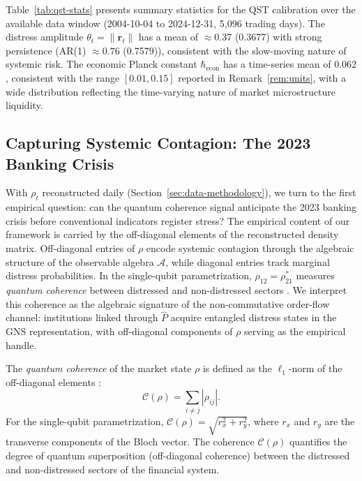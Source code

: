 

Table~\ref{tab:qst-stats} presents summary statistics for the QST calibration over
the available data window (2004-10-04 to 2024-12-31, 5{,}096 trading days). The
distress amplitude $\theta_t = \|\mathbf{r}_t\|$ has a mean of $\approx 0.37$ (0.3677) with strong
persistence (AR(1) $\approx 0.76$ (0.7579)), consistent with the slow-moving nature of systemic
risk. The economic Planck constant $\hbar_{\mathrm{econ}}$ has a time-series mean of
$0.062$, consistent with the range $[0.01, 0.15]$ reported in
Remark~\ref{rem:units}, with a wide distribution
reflecting the time-varying nature of market microstructure liquidity.

\subsection{Capturing Systemic Contagion: The 2023 Banking Crisis}
\label{sec:coherence-2023}

With $\rho_t$ reconstructed daily (Section~\ref{sec:data-methodology}), we
turn to the first empirical question: can the quantum coherence signal anticipate
the 2023 banking crisis before conventional indicators register stress?
The empirical content of our framework is carried by the off-diagonal elements of
the reconstructed density matrix. Off-diagonal entries of $\rho$ encode systemic
contagion through the algebraic structure of the observable algebra $\mathcal{A}$,
while diagonal entries track marginal distress probabilities. In the single-qubit
parametrization, $\rho_{12} = \rho_{21}^*$ measures \emph{quantum coherence} between
distressed and non-distressed sectors \citep{baumgratz2014quantifying}. We interpret
this coherence as the algebraic signature of the non-commutative order-flow channel:
institutions linked through $\hat{P}$ acquire entangled distress states in the GNS
representation, with off-diagonal components of $\rho$ serving as the empirical
handle.

\begin{definition}\label{def:coherence}
The \emph{quantum coherence} of the market state $\rho$ is defined as the
$\ell_1$-norm of the off-diagonal elements \citep{baumgratz2014quantifying}:
\begin{equation}\label{eq:coherence}
    \mathcal{C}(\rho) = \sum_{i \neq j} |\rho_{ij}|.
\end{equation}
For the single-qubit parametrization, $\mathcal{C}(\rho) = \sqrt{r_x^2 + r_y^2}$,
where $r_x$ and $r_y$ are the transverse components of the Bloch vector. The
coherence $\mathcal{C}(\rho)$ quantifies the degree of quantum superposition (off-diagonal coherence) between
the distressed and non-distressed sectors of the financial system.
\end{definition}

